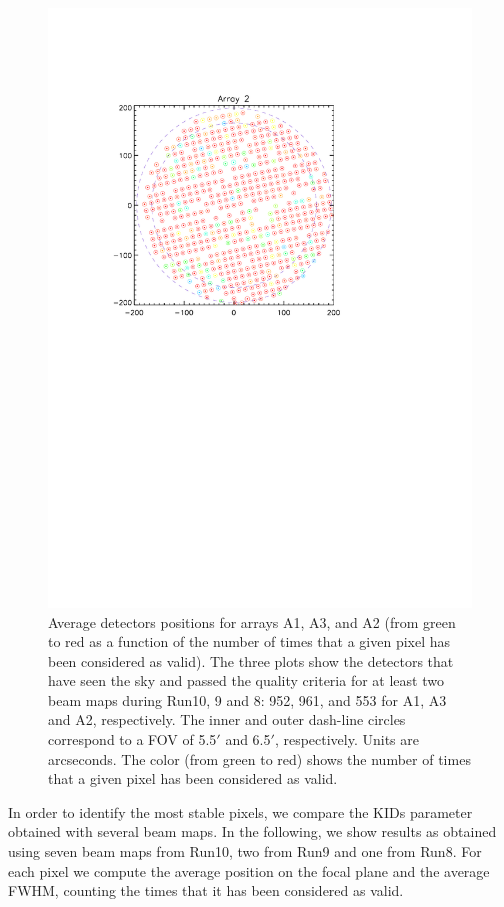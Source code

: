 \begin{figure}[p]
\begin{center}
\includegraphics[trim=2cm 14cm 4cm 4cm, clip=true,width=0.55\linewidth]{Figures/A2_fwhm_color_count.pdf}
\caption{Average detectors positions for arrays A1, A3, and A2 (from
  green to red as a function of the number of times that a given pixel
  has been considered as valid). The three plots show the detectors
  that have seen the sky and passed the quality criteria for at least
  two beam maps during Run10, 9 and 8: 952, 961, and 553
  for A1, A3 and A2, respectively. The inner and outer dash-line circles correspond to a 
  FOV of 5.5$\prime$ and 6.5$\prime$, respectively. Units are arcseconds. 
  The color (from green to red)  shows the number of times that a given pixel has been considered as valid.}
\label{fig:avg_fov_color}
\end{center}
\end{figure}

In order to identify the most stable pixels, we compare the KIDs parameter obtained with several beam maps. 
In the following, we   show results as obtained using seven beam maps from Run10, two from Run9 and one from Run8.
For each pixel we compute the average position on the focal plane and the average FWHM, counting the times that it has been considered as valid.

